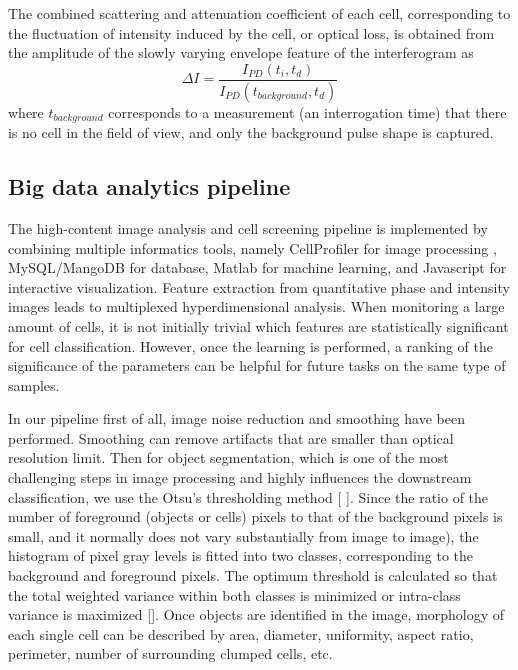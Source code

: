 \documentclass[aps,pra,preprint,superscriptaddress]{revtex4-1}
\begin{document}
The combined scattering and attenuation coefficient of each cell, corresponding to the fluctuation of intensity induced by the cell, or optical loss, is obtained from the amplitude of the slowly varying envelope feature of the interferogram as
\begin{equation}
\Delta I = \frac{I_{PD}(t_i,t_d)}{I_{PD}(t_{background},t_d)}
\end{equation}
where $t_{background}$ corresponds to a measurement (an interrogation time) that there is no cell in the field of view, and only the background pulse shape is captured. 

\subsection{Big data analytics pipeline}

The high-content image analysis and cell screening pipeline is implemented by combining multiple informatics tools, namely CellProfiler for image processing \cite{carpenter2006cellprofiler,kamentsky2011improved}, MySQL/MangoDB for database, Matlab for machine learning, and Javascript for interactive visualization. 
Feature extraction from quantitative phase and intensity images leads to multiplexed hyperdimensional analysis. When monitoring a large amount of cells, it is not initially trivial which features are statistically significant for cell classification. However, once the learning is performed, a ranking of the significance of the parameters can be helpful for future tasks on the same type of samples. 

In our pipeline first of all, image noise reduction and smoothing have been performed. Smoothing can remove artifacts that are smaller than optical resolution limit. Then for object segmentation, which is one of the most challenging steps in image processing and highly influences the downstream classification, we use the Otsu’s thresholding method [ ]. Since the ratio of the number of foreground (objects or cells) pixels to that of the background pixels is small, and it normally does not vary substantially from image to image), the histogram of pixel gray levels is fitted into two classes,  corresponding to the background and foreground pixels. The optimum threshold is calculated so that the total weighted variance within both classes is minimized or intra-class variance is maximized []. Once objects are identified in the image, morphology of each single cell can be described by area, diameter, uniformity, aspect ratio, perimeter, number of surrounding clumped cells, etc.
\end{document}
